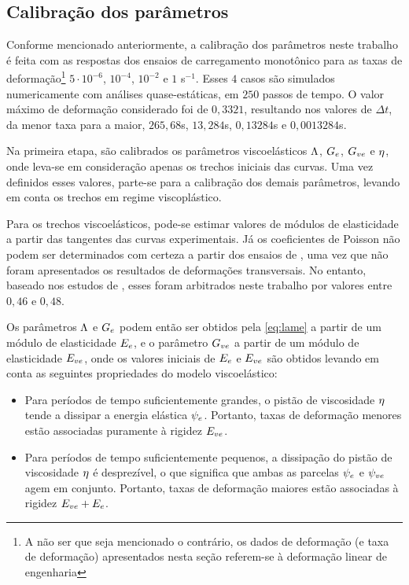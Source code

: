 \documentclass[Tese.tex]{subfiles}
\begin{document}
{\subsection{Calibração dos parâmetros}

Conforme mencionado anteriormente, a calibração dos parâmetros neste trabalho é feita com as respostas dos ensaios de carregamento monotônico para as taxas de deformação\footnote{A não ser que seja mencionado o contrário, os dados de deformação (e taxa de deformação) apresentados nesta seção referem-se à deformação linear de engenharia} $5\cdot 10^{-6}$, $10^{-4}$, $10^{-2}$ e $1$ s$^{-1}$. Esses $4$ casos são simulados numericamente com análises quase-estáticas, em $250$ passos de tempo. O valor máximo de deformação considerado foi de $0,3321$, resultando nos valores de $\Delta t$, da menor taxa para a maior, $265,68$s, $13,284$s, $0,13284$s e $0,0013284$s.

Na primeira etapa, são calibrados os parâmetros viscoelásticos $\Lambda$, $G_e$, $G_{ve}$ e $\eta$, onde leva-se em consideração apenas os trechos iniciais das curvas. Uma vez definidos esses valores, parte-se para a calibração dos demais parâmetros, levando em conta os trechos em regime viscoplástico.

Para os trechos viscoelásticos, pode-se estimar valores de módulos de elasticidade a partir das tangentes das curvas experimentais. Já os coeficientes de Poisson não podem ser determinados com certeza a partir dos ensaios de , uma vez que não foram apresentados os resultados de deformações transversais. No entanto, baseado nos estudos de , esses foram arbitrados neste trabalho por valores entre $0,46$ e $0,48$.

Os parâmetros $\Lambda$ e $G_e$ podem então ser obtidos pela \cref{eq:lame} a partir de um módulo de elasticidade $E_e$, e o parâmetro $G_{ve}$ a partir de um módulo de elasticidade $E_{ve}$, onde os valores iniciais de $E_e$ e $E_{ve}$ são obtidos levando em conta as seguintes propriedades do modelo viscoelástico:

\begin{itemize}
	\item Para períodos de tempo suficientemente grandes, o pistão de viscosidade $\eta$ tende a dissipar a energia elástica $\psi_e$. Portanto, taxas de deformação menores estão associadas puramente à rigidez $E_{ve}$.
	\item Para períodos de tempo suficientemente pequenos, a dissipação do pistão de viscosidade $\eta$ é desprezível, o que significa que ambas as parcelas $\psi_e$ e $\psi_{ve}$ agem em conjunto. Portanto, taxas de deformação maiores estão associadas à rigidez $E_{ve}+E_e$.
\end{itemize}

}
\end{document}
